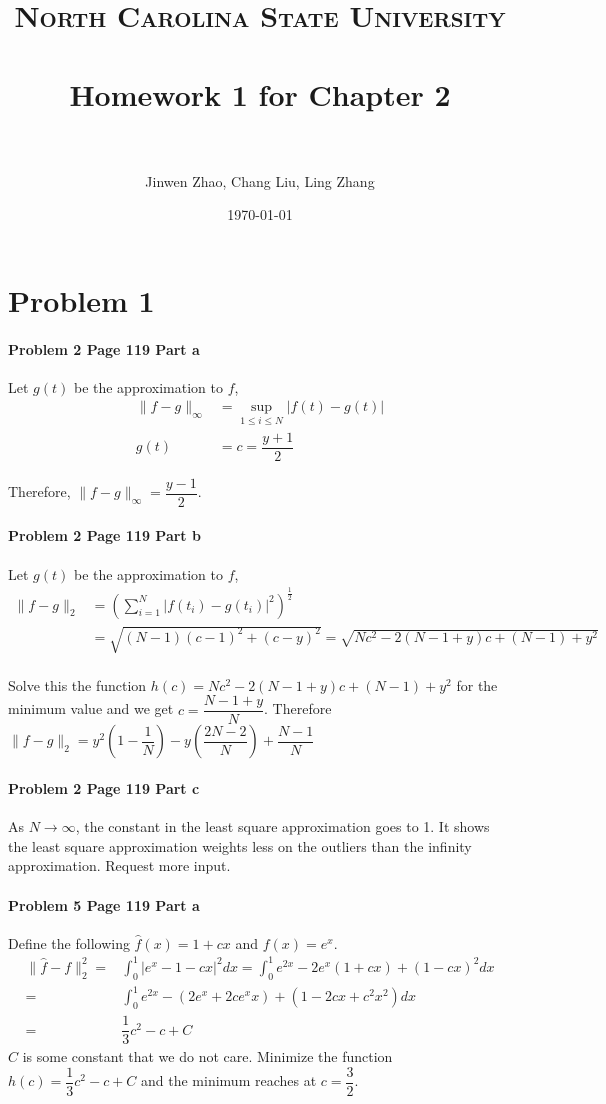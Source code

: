 \documentclass[paper=a4, fontsize=11pt]{scrartcl} %
\title{	
\normalfont \normalsize 
\textsc{North Carolina State University} \\ [25pt] %
\horrule{0.5pt} \\[0.4cm] %
\huge Homework 1 for Chapter 2 \\ %
\horrule{2pt} \\[0.5cm] %
}
\author{Jinwen Zhao, Chang Liu, Ling Zhang} %
\date{\normalsize\today} %
\numberwithin{equation}{section} %
\numberwithin{figure}{section} %
\numberwithin{table}{section} %
\begin{document}
\maketitle %


\section*{Problem 1}
\paragraph{\textbf{Problem 2 Page 119 Part a}} Let $ g(t) $ be the approximation to $ f $,
\begin{align*}
	\|f-g\|_{\infty}&=\sup_{1\leq i\leq N} | f(t)-g(t)|\\
	g(t)&=c=\dfrac{y+1}{2}
\end{align*}

Therefore, $ \|f-g\|_{\infty}=\dfrac{y-1}{2} $.

\paragraph{\textbf{Problem 2 Page 119 Part b}} Let $ g(t) $ be the approximation to $ f $,
\begin{align*}
	\|f-g\|_2&=({\sum_{i=1}^{N}|f(t_i)-g(t_i)|^{2}} )^{\frac{1}{2}}\\
			&=\sqrt{(N-1)(c-1)^2+(c-y)^2} = \sqrt{Nc^2-2(N-1+y)c+(N-1)+y^2}
\end{align*}\\
Solve this the function $ h(c)=Nc^2-2(N-1+y)c+(N-1)+y^2 $ for the minimum value and we get $ c=\dfrac{N-1+y}{N} $. Therefore $ \|f-g\|_2=y^2(1-\dfrac{1}{N})-y(\dfrac{2N-2}{N})+\dfrac{N-1}{N} $

\paragraph{\textbf{Problem 2 Page 119 Part c}} As $ N\rightarrow \infty $, the constant in the least square approximation goes to 1. It shows the least square approximation weights less on the outliers than the infinity approximation. Request more input.

\newpage
\paragraph{\textbf{Problem 5 Page 119 Part a}}  
Define the following $ \hat{f}(x)=1+cx $ and $ f(x)=e^x $.\\
\begin{align*}
	\|\hat{f}-f\|^2_2=&\int_{0}^{1}|e^x-1-cx|^2 dx=\int_{0}^{1}e^{2x}-2e^x(1+cx)+(1-cx)^2dx\\
	=&\int_{0}^{1}e^{2x}-(2e^x+2ce^xx)+(1-2cx+c^2x^2)dx\\
	=&\dfrac{1}{3}c^2-c+C
\end{align*}
$ C $ is some constant that we do not care. Minimize the function $ h(c)=\dfrac{1}{3}c^2-c+C $ and the minimum reaches at $ c=\dfrac{3}{2} $.
\end{document}
